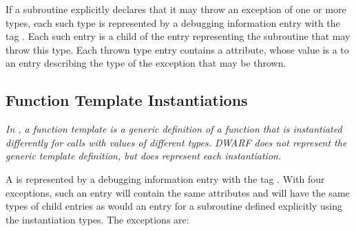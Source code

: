 If a subroutine explicitly declares that it may throw
an 
exception of one or more types, each such type is
represented by a debugging information entry with 
the tag
.  
Each such entry is a child of the entry
representing the subroutine that may throw this type. Each
thrown type entry contains 
a  attribute, whose
value is a  
to an entry describing the type of the
exception that may be thrown.

\subsection{Function Template Instantiations}
\label{chap:functiontemplateinstantiations}

\textit{In , a function template is a generic definition of
a function that is instantiated differently for calls with
values of different types. DWARF does not represent the generic
template definition, but does represent each instantiation.}

A  is represented by a debugging
information entry with the 
tag . 
With four
exceptions, such an entry will contain the same attributes and
will have the same types of child entries as would an entry
for a subroutine defined explicitly using the instantiation
types. The exceptions are:

